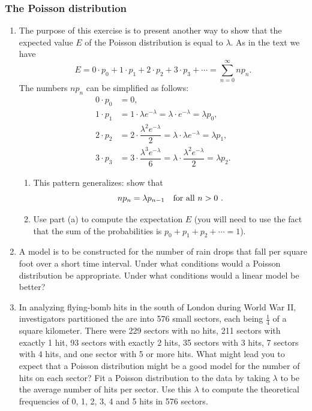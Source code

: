 \subsubsection{The Poisson distribution}
\label{subsubsec:the-poisson-distribution}




\begin{enumerate}
\item The purpose of this exercise is to present another way to show
that the expected value $E$ of the Poisson distribution is equal to
$\lambda$.  As in the text we have
\[
E = 0 \cdot p_0 + 1 \cdot p_1 + 2 \cdot p_2 + 3 \cdot p_3
        + \cdots = \sum_{n=0}^\infty n p_n. 
\]
The numbers $np_n$ can be simplified as
follows:
\begin{align*}
0\cdot p_0 &=  0 ,\\[2pt]
1\cdot p_1 &=  1\cdot\lambda e^{-\lambda}  =
         \lambda\cdot e^{-\lambda}  =  \lambda p_0, \\[5pt]
2\cdot p_2 &=  2\cdot \dfrac{\lambda^2e^{-\lambda}}{2}  =
         \lambda\cdot\lambda e^{-\lambda}  =  
		\lambda p_1,  \\[10pt]
3\cdot p_3 &=  3\cdot \dfrac{\lambda^3e^{-\lambda}}{6}  =
         \lambda \cdot \dfrac{\lambda^2e^{-\lambda}}{2}  =
         \lambda p_2.
\end{align*}


  \begin{enumerate}
  \item This pattern generalizes: show that
\[np_n = \lambda p_{n-1}\quad\hbox{for all $n > 0$}\ .\]


  \item Use part (a) to compute the expectation $E$ (you will need to
use the fact that the sum of the
probabilities is $p_0+p_1+p_2+\cdots = 1$).



\end{enumerate}
\item A model is to be constructed for the number of rain drops that
fall per square foot over a short time interval.  Under what conditions 
would a Poisson distribution be appropriate.  Under what conditions would 
a linear model be better?


\item In analyzing flying-bomb hits in the south of London during World
War II, investigators partitioned the are into 576 small sectors, each
being $\frac{1}{4}$ of a square kilometer.  There were 229 sectors
with no hits, 211 sectors with exactly 1 hit, 93 sectors with exactly
2 hits, 35 sectors with 3 hits, 7 sectors with 4 hits, and one sector
with 5 or more hits.  What might lead you to expect that a Poisson
distribution might be a good model for the number of hits on each
sector?  Fit a Poisson distribution to the data by taking $\lambda$ to
be the average number of hits per sector.  Use this $\lambda$ to
compute the theoretical frequencies of 0, 1, 2, 3, 4 and 5 hits in 576
sectors.



\end{enumerate}
